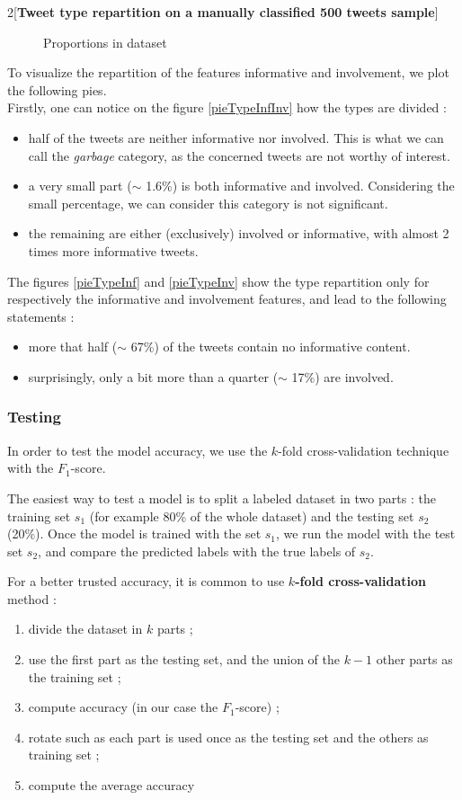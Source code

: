 \documentclass[a4paper,12pt]{report}
\begin{document}
\begin{multicols}{2}[\textbf{Tweet type repartition on a manually classified 500 tweets sample}]
\begin{figure}[H]
\caption{Proportions in dataset}
\end{figure}

To visualize the repartition of the features informative and involvement, we plot the following pies.\\
Firstly, one can notice on the figure \ref{pieTypeInfInv} how the types are divided : 
\begin{itemize}
\item half of the tweets are neither informative nor involved. This is what we can call the \emph{garbage} category, as the concerned tweets are not worthy of interest.
\item a very small part ($\sim$ 1.6\%) is both informative and involved. Considering the small percentage, we can consider this category is not significant.
\item the remaining are either (exclusively) involved or informative, with almost 2 times more informative tweets.
\end{itemize}

The figures \ref{pieTypeInf} and \ref{pieTypeInv} show the type repartition only for respectively the informative and involvement features, and lead to the following statements :
\begin{itemize}
\item more that half ($\sim$ 67\%) of the tweets contain no informative content.
\item surprisingly, only a bit more than a quarter ($\sim$ 17\%) are involved.
\end{itemize}


\end{multicols}

\subsubsection{Testing}
In order to test the model accuracy, we use the $k$-fold cross-validation technique with the $F_1$-score.

The easiest way to test a model is to split a labeled dataset in two parts : the training set $s_1$ (for example 80\% of the whole dataset) and the testing set $s_2$ (20\%). Once the model is trained with the set $s_1$, we run the model with the test set $s_2$, and compare the predicted labels with the true labels of $s_2$.

For a better trusted accuracy, it is common to use \textbf{$k$-fold cross-validation} method :
\begin{enumerate}
\item divide the dataset in $k$ parts ;
\item use the first part as the testing set, and the union of the $k-1$ other parts as the training set ;
\item compute accuracy (in our case the $F_1$-score) ;
\item rotate such as each part is used once as the testing set and the others as training set ;
\item compute the average accuracy
\end{enumerate}
\end{document}
